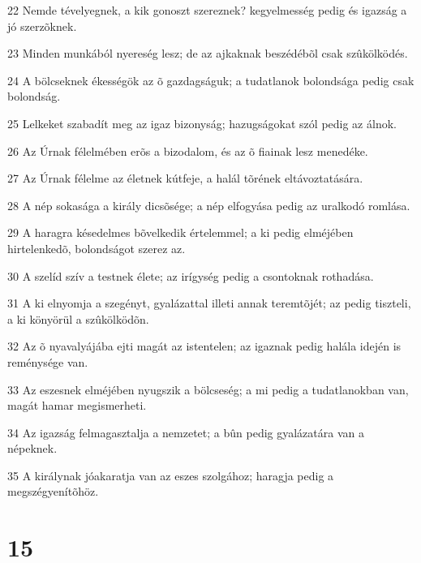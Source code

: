 \par 22 Nemde tévelyegnek, a kik gonoszt szereznek? kegyelmesség pedig és igazság a jó szerzõknek.
\par 23 Minden munkából nyereség lesz; de az ajkaknak beszédébõl csak szûkölködés.
\par 24 A bölcseknek ékességök az õ gazdagságuk; a tudatlanok bolondsága pedig csak bolondság.
\par 25 Lelkeket szabadít meg az igaz bizonyság; hazugságokat szól pedig az álnok.
\par 26 Az Úrnak félelmében erõs a bizodalom, és az õ fiainak lesz menedéke.
\par 27 Az Úrnak félelme az életnek kútfeje, a halál tõrének eltávoztatására.
\par 28 A nép sokasága a király dicsõsége; a nép elfogyása pedig az uralkodó romlása.
\par 29 A haragra késedelmes bõvelkedik értelemmel; a ki pedig elméjében hirtelenkedõ, bolondságot szerez az.
\par 30 A szelíd szív a testnek élete; az irígység pedig a csontoknak rothadása.
\par 31 A ki elnyomja a szegényt, gyalázattal illeti annak teremtõjét; az pedig tiszteli,  a ki könyörül a szûkölködõn.
\par 32 Az õ nyavalyájába ejti magát az istentelen; az igaznak pedig halála idején is reménysége van.
\par 33 Az eszesnek elméjében nyugszik a bölcseség; a mi pedig a tudatlanokban van, magát hamar megismerheti.
\par 34 Az igazság felmagasztalja a nemzetet; a bûn pedig gyalázatára van a népeknek.
\par 35 A királynak jóakaratja van az eszes szolgához; haragja pedig a megszégyenítõhöz.

\chapter{15}

